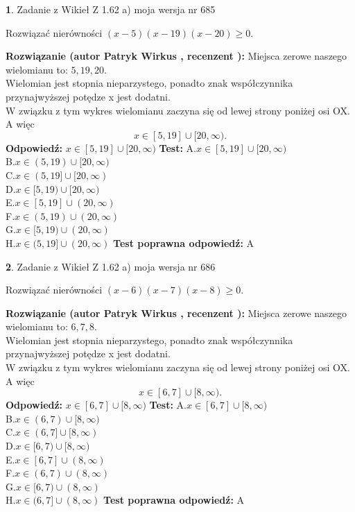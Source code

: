\documentclass[12pt, a4paper]{article}
\theoremstyle{definition} %
\newtheorem{zad}{}
\newcommand{\zadStart}[1]{\begin{zad}#1\newline}
\newcommand{\zadStop}{\end{zad}}
\newcommand{\rozwStart}[2]{\noindent \textbf{Rozwiązanie (autor #1 , recenzent #2): }\newline}
\newcommand{\rozwStop}{\newline}
\newcommand{\odpStart}{\noindent \textbf{Odpowiedź:}\newline}
\newcommand{\odpStop}{\newline}
\newcommand{\testStart}{\noindent \textbf{Test:}\newline}
\newcommand{\testStop}{\newline}
\newcommand{\kluczStart}{\noindent \textbf{Test poprawna odpowiedź:}\newline}
\newcommand{\kluczStop}{\newline}
\begin{document}
\zadStart{Zadanie z Wikieł Z 1.62 a) moja wersja nr 685}

Rozwiązać nierówności $(x-5)(x-19)(x-20)\ge0$.
\zadStop
\rozwStart{Patryk Wirkus}{}
Miejsca zerowe naszego wielomianu to: $5, 19, 20$.\\
Wielomian jest stopnia nieparzystego, ponadto znak współczynnika przy\linebreak najwyższej potędze x jest dodatni.\\ W związku z tym wykres wielomianu zaczyna się od lewej strony poniżej osi OX. A więc $$x \in [5,19] \cup [20,\infty).$$
\rozwStop
\odpStart
$x \in [5,19] \cup [20,\infty)$
\odpStop
\testStart
A.$x \in [5,19] \cup [20,\infty)$\\
B.$x \in (5,19) \cup [20,\infty)$\\
C.$x \in (5,19] \cup [20,\infty)$\\
D.$x \in [5,19) \cup [20,\infty)$\\
E.$x \in [5,19] \cup (20,\infty)$\\
F.$x \in (5,19) \cup (20,\infty)$\\
G.$x \in [5,19) \cup (20,\infty)$\\
H.$x \in (5,19] \cup (20,\infty)$
\testStop
\kluczStart
A
\kluczStop



\zadStart{Zadanie z Wikieł Z 1.62 a) moja wersja nr 686}

Rozwiązać nierówności $(x-6)(x-7)(x-8)\ge0$.
\zadStop
\rozwStart{Patryk Wirkus}{}
Miejsca zerowe naszego wielomianu to: $6, 7, 8$.\\
Wielomian jest stopnia nieparzystego, ponadto znak współczynnika przy\linebreak najwyższej potędze x jest dodatni.\\ W związku z tym wykres wielomianu zaczyna się od lewej strony poniżej osi OX. A więc $$x \in [6,7] \cup [8,\infty).$$
\rozwStop
\odpStart
$x \in [6,7] \cup [8,\infty)$
\odpStop
\testStart
A.$x \in [6,7] \cup [8,\infty)$\\
B.$x \in (6,7) \cup [8,\infty)$\\
C.$x \in (6,7] \cup [8,\infty)$\\
D.$x \in [6,7) \cup [8,\infty)$\\
E.$x \in [6,7] \cup (8,\infty)$\\
F.$x \in (6,7) \cup (8,\infty)$\\
G.$x \in [6,7) \cup (8,\infty)$\\
H.$x \in (6,7] \cup (8,\infty)$
\testStop
\kluczStart
A
\kluczStop
\end{document}
